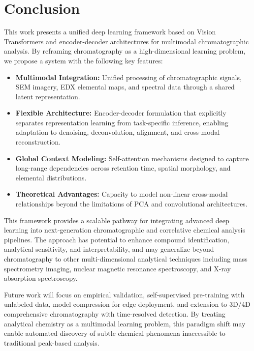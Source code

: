 \documentclass[12pt,a4paper]{article}
\begin{document}
\section{Conclusion}

This work presents a unified deep learning framework based on Vision Transformers and encoder-decoder architectures for multimodal chromatographic analysis. By reframing chromatography as a high-dimensional learning problem, we propose a system with the following key features:

\begin{itemize}
    \item \textbf{Multimodal Integration:} Unified processing of chromatographic signals, SEM imagery, EDX elemental maps, and spectral data through a shared latent representation.
    
    \item \textbf{Flexible Architecture:} Encoder-decoder formulation that explicitly separates representation learning from task-specific inference, enabling adaptation to denoising, deconvolution, alignment, and cross-modal reconstruction.
    
    \item \textbf{Global Context Modeling:} Self-attention mechanisms designed to capture long-range dependencies across retention time, spatial morphology, and elemental distributions.
    
    \item \textbf{Theoretical Advantages:} Capacity to model non-linear cross-modal relationships beyond the limitations of PCA and convolutional architectures.
\end{itemize}

This framework provides a scalable pathway for integrating advanced deep learning into next-generation chromatographic and correlative chemical analysis pipelines. The approach has potential to enhance compound identification, analytical sensitivity, and interpretability, and may generalize beyond chromatography to other multi-dimensional analytical techniques including mass spectrometry imaging, nuclear magnetic resonance spectroscopy, and X-ray absorption spectroscopy.

Future work will focus on empirical validation, self-supervised pre-training with unlabeled data, model compression for edge deployment, and extension to 3D/4D comprehensive chromatography with time-resolved detection. By treating analytical chemistry as a multimodal learning problem, this paradigm shift may enable automated discovery of subtle chemical phenomena inaccessible to traditional peak-based analysis.
\end{document}
